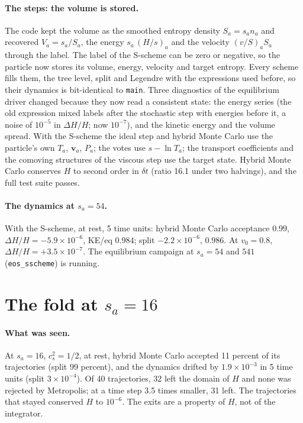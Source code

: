 \documentclass[11pt,aps,preprint,nofootinbib,superscriptaddress,tightenlines]{revtex4-2}
\let\oldparagraph\paragraph
\renewcommand{\paragraph}{\par\bigskip\oldparagraph}
\begin{document}
\paragraph{The steps: the volume is stored.}  The code kept the volume as the smoothed entropy density $S_a=s_an_a$ and recovered $V_a=s_a/S_a$, the
energy $s_a\,(H/s)_a$ and the velocity $(v/S)_aS_a$ through the label.  The label of the S-scheme can be zero or negative, so the particle now stores
its volume, energy, velocity and target entropy.  Every scheme fills them, the tree level, split and Legendre with the expressions used before, so
their dynamics is bit-identical to \texttt{main}.  Three diagnostics of the equilibrium driver changed because they now read a consistent state: the
energy series (the old expression mixed labels after the stochastic step with energies before it, a noise of $10^{-5}$ in $\Delta H/H$; now $10^{-7}$),
and the kinetic energy and the volume spread.  With the S-scheme the ideal step and hybrid Monte Carlo use the particle's own $T_a$, $\bm v_a$, $P_a$;
the votes use $s-\ln T_a$; the transport coefficients and the comoving structures of the viscous step use the target state.  Hybrid Monte Carlo
conserves $H$ to second order in $\delta t$ (ratio 16.1 under two halvings), and the full test suite passes.

\paragraph{The dynamics at $s_a=54$.}  With the S-scheme, at rest, 5 time units: hybrid Monte Carlo acceptance 0.99, $\Delta H/H=-5.9\times10^{-6}$,
KE/eq $0.984$; split $-2.2\times10^{-6}$, $0.986$.  At $v_0=0.8$, $\Delta H/H=+3.5\times10^{-7}$.  The equilibrium campaign at $s_a=54$ and $541$
(\texttt{eos\_sscheme}) is running.

\section{The fold at $s_a=16$}
\label{sec:fold}

\paragraph{What was seen.}  At $s_a=16$, $c_s^2=1/2$, at rest, hybrid Monte Carlo accepted 11 percent of its trajectories (split 99 percent), and the
dynamics drifted by $1.9\times10^{-3}$ in 5 time units (split $3\times10^{-4}$).  Of 40 trajectories, 32 left the domain of $H$ and none was
rejected by Metropolis; at a time step 3.5 times smaller, 31 left.  The trajectories that stayed conserved $H$ to $10^{-6}$.  The exits are a property
of $H$, not of the integrator.
\end{document}
